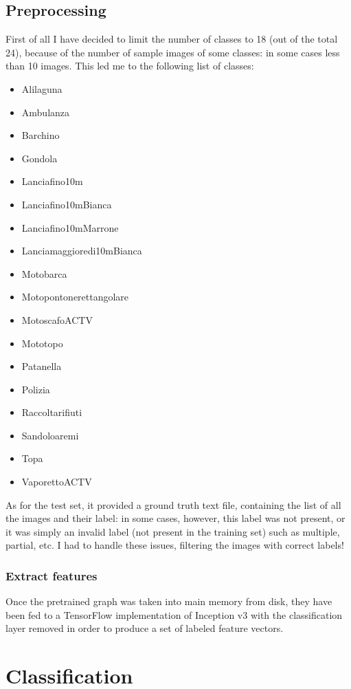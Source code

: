 \documentclass[12pt]{article}
\begin{document}
\subsection{Preprocessing}
First of all I have decided to limit the number of classes to 18 (out of the total 24), because of the number of sample images of some classes: in some cases less than 10 images. This led me to the following list of classes:
\begin{itemize}
	\item Alilaguna
	\item Ambulanza
	\item Barchino
	\item Gondola
	\item Lanciafino10m
	\item Lanciafino10mBianca
	\item Lanciafino10mMarrone
	\item Lanciamaggioredi10mBianca
	\item Motobarca
	\item Motopontonerettangolare
	\item MotoscafoACTV
	\item Mototopo
	\item Patanella
	\item Polizia
	\item Raccoltarifiuti
	\item Sandoloaremi
	\item Topa
	\item VaporettoACTV
\end{itemize}
As for the test set, it provided a ground truth text file, containing the list of all the images and their label: in some cases, however, this label was not present, or it was simply an invalid label (not present in the training set) such as multiple, partial, etc. I had to handle these issues, filtering the images with correct labels!

\subsubsection{Extract features}
Once the pretrained graph was taken into main memory from disk, they have been fed to a TensorFlow implementation of Inception v3 with the classification layer removed in order to produce a set of labeled feature vectors.

\section{Classification}
\end{document}
